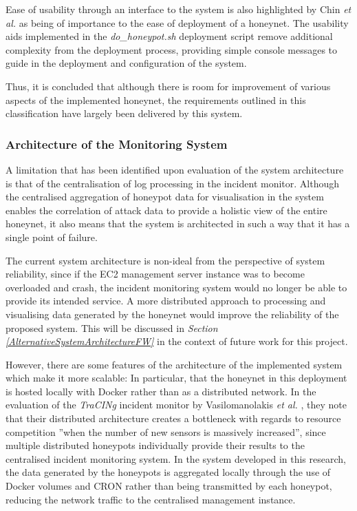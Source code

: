 \begin{enumerate}
Ease of usability through an interface to the system is also highlighted by Chin \textit{et al.} as being of importance to the ease of deployment of a honeynet. \cite{5319295} The usability aids implemented in the \textit{do\_honeypot.sh} deployment script remove additional complexity from the deployment process, providing simple console messages to guide in the deployment and configuration of the system.
\end{enumerate}
Thus, it is concluded that although there is room for improvement of various aspects of the implemented honeynet, the requirements outlined in this classification have largely been delivered by this system.


\subsubsection{Architecture of the Monitoring System}
\label{CentralisedManagementEvaluation}
A limitation that has been identified upon evaluation of the system architecture is that of the centralisation of log processing in the incident monitor. Although the centralised aggregation of honeypot data for visualisation in the system enables the correlation of attack data to provide a holistic view of the entire honeynet, it also means that the system is architected in such a way that it has a single point of failure.

The current system architecture is non-ideal from the perspective of system reliability, since if the EC2 management server instance was to become overloaded and crash, the incident monitoring system would no longer be able to provide its intended service. A more distributed approach to processing and visualising data generated by the honeynet would improve the reliability of the proposed system. This will be discussed in \textit{Section \ref{AlternativeSystemArchitectureFW}} in the context of future work for this project.

However, there are some features of the architecture of the implemented system which make it more scalable: In particular, that the honeynet in this deployment is hosted locally with Docker rather than as a distributed network. In the evaluation of the \textit{TraCINg} incident monitor by Vasilomanolakis \textit{et al.} \cite{Vasilomanolakis}, they note that their distributed architecture creates a bottleneck with regards to resource competition ''when the number of new sensors is massively increased'', since multiple distributed honeypots individually provide their results to the centralised incident monitoring system. In the system developed in this research, the data generated by the honeypots is aggregated locally through the use of Docker volumes and CRON rather than being transmitted by each honeypot, reducing the network traffic to the centralised management instance.

